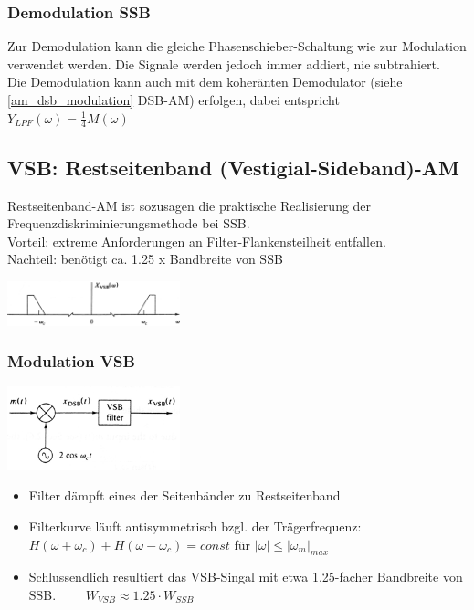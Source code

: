 \subsubsection{Demodulation SSB}
Zur Demodulation kann die gleiche Phasenschieber-Schaltung wie zur Modulation verwendet
werden. Die Signale werden jedoch immer addiert, nie subtrahiert. \\
Die Demodulation kann auch mit dem koheränten Demodulator (siehe \ref{am_dsb_modulation} DSB-AM) erfolgen, dabei entspricht\\
$Y_{LPF}(\omega) = \frac{1}{4}M(\omega)$ \\


\subsection{VSB: Restseitenband (Vestigial-Sideband)-AM}
	\begin{minipage}{12cm}
		Restseitenband-AM ist sozusagen die praktische Realisierung der Frequenzdiskriminierungsmethode bei
		SSB. \\
		Vorteil: extreme Anforderungen an Filter-Flankensteilheit entfallen.\\
		Nachteil: ben\"otigt ca. 1.25 x Bandbreite von SSB
	\end{minipage}
	\begin{minipage}{5cm}
		\begin{center}
		    \includegraphics[width=5cm]{bilder/am_vsb_spektrum.png}
		\end{center}
	\end{minipage}
	
	\subsubsection{Modulation VSB}
		\begin{minipage}[t][2.2cm][c]{5.5cm}
    		\includegraphics[width=5cm]{bilder/am_vsb_modulator.png}
		\end{minipage}
		\begin{minipage}[t][2.2cm][c]{12.5cm}	
			\begin{itemize}
				\item Filter d\"ampft eines der Seitenbänder zu Restseitenband
				\item Filterkurve läuft antisymmetrisch bzgl. der Trägerfrequenz: \\
				$H(\omega +
				\omega_c) + H(\omega - \omega_c) = const$ für $|\omega| \leq |\omega_m|_{max}$
				\item Schlussendlich resultiert das VSB-Singal  mit etwa 1.25-facher Bandbreite von SSB. $ \qquad  W_{VSB} \approx 1.25 \cdot W_{SSB} $
			\end{itemize}
		\end{minipage}


